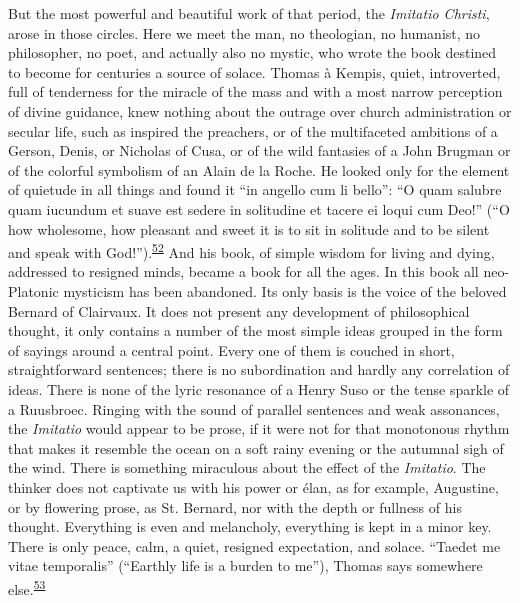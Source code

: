 But the most powerful and beautiful work of that period, the
\emph{\protect\hypertarget{17_Chapter_Ten__THE_FAILURE_OF_IMAG.xhtmlux5cux23page_266}{}{}Imitatio
Christi}, arose in those circles. Here we meet the man, no theologian,
no humanist, no philosopher, no poet, and actually also no mystic, who
wrote the book destined to become for centuries a source of solace.
Thomas à Kempis, quiet, introverted, full of tenderness for the miracle
of the mass and with a most narrow perception of divine guidance, knew
nothing about the outrage over church administration or secular life,
such as inspired the preachers, or of the multifaceted ambitions of a
Gerson, Denis, or Nicholas of Cusa, or of the wild fantasies of a John
Brugman or of the colorful symbolism of an Alain de la Roche. He looked
only for the element of quietude in all things and found it ``in angello
cum li bello'': ``O quam salubre quam iucundum et suave est sedere in
solitudine et tacere ei loqui cum Deo!'' (``O how wholesome, how
pleasant and sweet it is to sit in solitude and to be silent and speak
with
God!'').\textsuperscript{\protect\hypertarget{17_Chapter_Ten__THE_FAILURE_OF_IMAG.xhtmlux5cux23id_633}{\protect\hyperlink{23_NOTES.xhtmlux5cux23id_634}{52}}}
And his book, of simple wisdom for living and dying, addressed to
resigned minds, became a book for all the ages. In this book all
neo-Platonic mysticism has been abandoned. Its only basis is the voice
of the beloved Bernard of Clairvaux. It does not present any development
of philosophical thought, it only contains a number of the most simple
ideas grouped in the form of sayings around a central point. Every one
of them is couched in short, straightforward sentences; there is no
subordination and hardly any correlation of ideas. There is none of the
lyric resonance of a Henry Suso or the tense sparkle of a Ruusbroec.
Ringing with the sound of parallel sentences and weak assonances, the
\emph{Imitatio} would appear to be prose, if it were not for that
monotonous rhythm that makes it resemble the ocean on a soft rainy
evening or the autumnal sigh of the wind. There is something miraculous
about the effect of the \emph{Imitatio}. The thinker does not captivate
us with his power or élan, as for example, Augustine, or by flowering
prose, as St. Bernard, nor with the depth or fullness of his thought.
Everything is even and melancholy, everything is kept in a minor key.
There is only peace, calm, a quiet, resigned expectation, and solace.
``Taedet me vitae temporalis'' (``Earthly life is a burden to me''),
Thomas says somewhere
else.\textsuperscript{\protect\hypertarget{17_Chapter_Ten__THE_FAILURE_OF_IMAG.xhtmlux5cux23id_631}{\protect\hyperlink{23_NOTES.xhtmlux5cux23id_632}{53}}}
